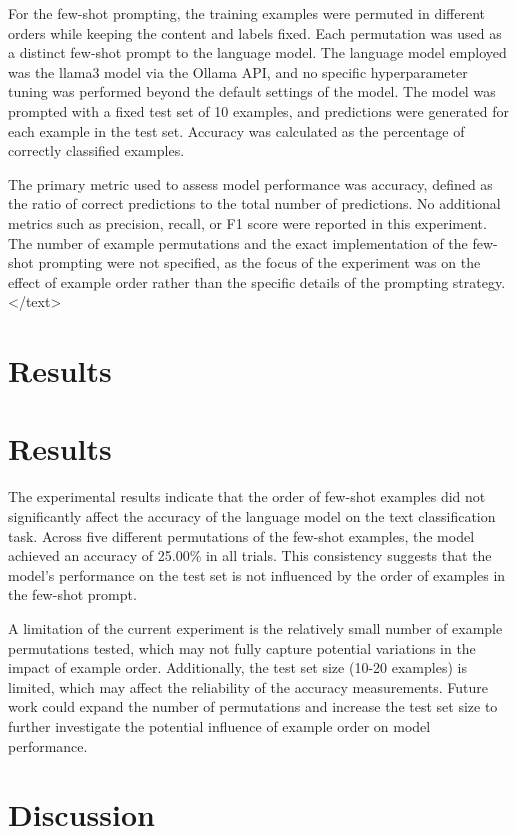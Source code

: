 \documentclass{article}
\begin{document}
For the few-shot prompting, the training examples were permuted in different orders while keeping the content and labels fixed. Each permutation was used as a distinct few-shot prompt to the language model. The language model employed was the llama3 model via the Ollama API, and no specific hyperparameter tuning was performed beyond the default settings of the model. The model was prompted with a fixed test set of 10 examples, and predictions were generated for each example in the test set. Accuracy was calculated as the percentage of correctly classified examples.

The primary metric used to assess model performance was accuracy, defined as the ratio of correct predictions to the total number of predictions. No additional metrics such as precision, recall, or F1 score were reported in this experiment. The number of example permutations and the exact implementation of the few-shot prompting were not specified, as the focus of the experiment was on the effect of example order rather than the specific details of the prompting strategy.
</text>
\section{Results}
\section{Results}

The experimental results indicate that the order of few-shot examples did not significantly affect the accuracy of the language model on the text classification task. Across five different permutations of the few-shot examples, the model achieved an accuracy of 25.00\% in all trials. This consistency suggests that the model's performance on the test set is not influenced by the order of examples in the few-shot prompt. 

A limitation of the current experiment is the relatively small number of example permutations tested, which may not fully capture potential variations in the impact of example order. Additionally, the test set size (10-20 examples) is limited, which may affect the reliability of the accuracy measurements. Future work could expand the number of permutations and increase the test set size to further investigate the potential influence of example order on model performance.
\section{Discussion}
\end{document}
